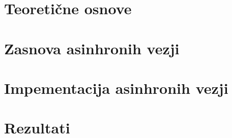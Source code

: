 \chapter{Teoretične osnove} \label{osnove}


\chapter{Zasnova asinhronih vezji} \label{zasnova}


\chapter{Impementacija asinhronih vezji} \label{implementacija}


\chapter{Rezultati} \label{rezultati}



